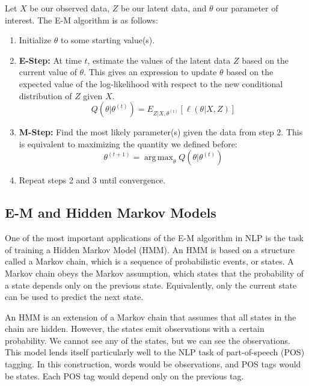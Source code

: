 \documentclass[14pt]{article}
\DeclareMathOperator*{\argmax}{arg\,max}
\begin{document}
Let $X$ be our observed data, $Z$ be our latent data, and $\theta$ our parameter of interest.  The E-M algorithm is as follows:
\begin{enumerate}
\item Initialize $\theta$ to some starting value(s).
\item \textbf{E-Step:} At time $t$, estimate the values of the latent data $Z$ based on the current value of $\theta$.  This gives an expression to update $\theta$ based on the expected value of the log-likelihood with respect to the new conditional distribution of $Z$ given $X$. 
$$Q(\theta|\theta^{(t)}) = E_{Z|X,\theta^{(t)}}[\ell(\theta|X, Z)]$$
\item \textbf{M-Step:} Find the most likely parameter(s) given the data from step 2.  This is equivalent to maximizing the quantity we defined before:
$$\theta^{(t+1)} = \argmax_{\theta}Q(\theta|\theta^{(t)})$$
\item Repeat steps 2 and 3 until convergence.
\end{enumerate}

\begin{center}
\subsection*{E-M and Hidden Markov Models}
\end{center}

One of the most important applications of the E-M algorithm in NLP is the task of training a Hidden Markov Model (HMM).  An HMM is based on a structure called a Markov chain, which is a sequence of probabilistic events, or states.  A Markov chain obeys the Markov assumption, which states that the probability of a state depends only on the previous state.  Equivalently, only the current state can be used to predict the next state.

An HMM is an extension of a Markov chain that assumes that all states in the chain are hidden.  However, the states emit observations with a certain probability.  We cannot see any of the states, but we can see the observations.  This model lends itself particularly well to the NLP task of part-of-speech (POS) tagging.  In this construction, words would be observations, and POS tags would be states.  Each POS tag would depend only on the previous tag.
\end{document}

